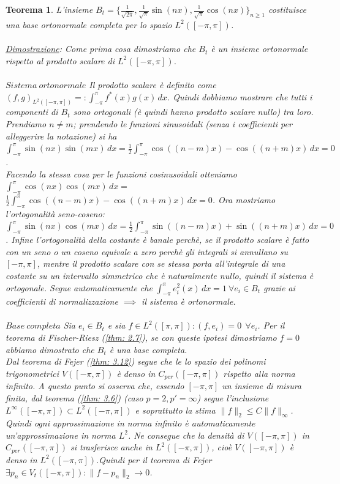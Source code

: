 \documentclass[a4paper,12pt]{report}
\newtheorem{teorema}{Teorema}[chapter]
\begin{document}
\begin{teorema}
    L'insieme $B_t=\bigg\{\displaystyle\frac{1}{\sqrt{2\pi}}, \frac{1}{\sqrt{\pi}}\sin({nx}), \frac{1}{\sqrt{\pi}}\cos({nx})\bigg\}_{n\geq 1}$ costituisce una base ortonormale completa per lo spazio $L^2([-\pi,\pi])$.
    \\
    \\ \underline{Dimostrazione}: Come prima cosa dimostriamo che $B_t$ è un insieme ortonormale rispetto al prodotto scalare di $L^2([-\pi,\pi])$.
    \\
    \\ $\boxed{Sistema \ ortonormale}$ Il prodotto scalare è definito come $(f,g)_{L^2([-\pi,\pi])}=:\displaystyle\int_{-\pi}^\pi f^*(x)g(x)\,dx$. Quindi dobbiamo mostrare che tutti i componenti di $B_t$ sono ortogonali (è quindi hanno prodotto scalare nullo) tra loro.
    \\ Prendiamo $n\neq m$; prendendo le funzioni sinusoidali (senza i coefficienti per alleggerire la notazione) si ha $\displaystyle\int_{-\pi}^\pi \sin({nx})\sin({mx})\,dx=\frac{1}{2}\int_{-\pi}^\pi\cos((n-m)x)-\cos((n+m)x)\,dx=0$.
    \\ Facendo la stessa cosa per le funzioni cosinusoidali otteniamo $\displaystyle\int_{-\pi}^\pi\cos(nx)\cos(mx)\,dx=$
    \\ $\displaystyle\frac{1}{2}\int_{-\pi}^\pi\cos((n-m)x)-\cos((n+m)x)\,dx=0$. Ora mostriamo l'ortogonalità seno-coseno:
    \\ $\displaystyle\int_{-\pi}^\pi \sin(nx)\cos(mx)\,dx=\frac{1}{2}\int_{-\pi}^\pi \sin((n-m)x)+\sin((n+m)x)\,dx=0$. Infine l'ortogonalità della costante è banale perchè, se il prodotto scalare è fatto con un seno o un coseno equivale a zero perchè gli integrali si annullano su $[-\pi,\pi]$, mentre il prodotto scalare con se stessa porta all'integrale di una costante su un intervallo simmetrico che è naturalmente nullo, quindi il sistema è ortogonale. Segue automaticamente che $\displaystyle \int_{-\pi}^\pi e_i^2(x) \,dx=1 \ \forall e_i\in B_t$ grazie ai coefficienti di normalizzazione $\implies$ il sistema è ortonormale.
    \\
    \\ $\boxed{Base \ completa}$ Sia $e_i\in B_t$ e sia $f\in L^2([\pi,\pi]): (f,e_i)=0 \ \ \forall e_i$. Per il teorema di Fischer-Riesz (\ref{thm: 2.7}), se con queste ipotesi dimostriamo $f=0$ abbiamo dimostrato che $B_t$ è una base completa.
    \\ Dal teorema di Fejer (\ref{thm: 3.12}) segue che le lo spazio dei polinomi trigonometrici $V([-\pi,\pi])$ è denso in $C_{per}([-\pi,\pi])$ rispetto alla norma infinito. A questo punto si osserva che, essendo $[-\pi,\pi]$ un insieme di misura finita, dal teorema (\ref{thm: 3.6}) (caso $p=2, p'=\infty$) segue l’inclusione $L^\infty([-\pi,\pi])\subset L^2([-\pi,\pi])$ e soprattutto la stima $\|f\|_2 \leq C\|f\|_\infty$. Quindi ogni approssimazione in norma infinito è automaticamente un’approssimazione in norma $L^2$. Ne consegue che la densità di $V([-\pi,\pi])$ in $C_{per}([-\pi,\pi])$ si trasferisce anche in $L^2([-\pi,\pi])$, cioè $V([-\pi,\pi])$ è denso in $L^2([-\pi,\pi])$.Quindi per il teorema di Fejer $\exists p_n\in V_t([-\pi,\pi]): \|f-p_n\|_2\to 0$. 

\end{teorema}
\end{document}

